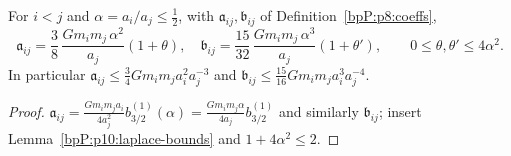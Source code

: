 \begin{corollary}\label{bpP:p10:formula69}
For $i<j$ and $\alpha=a_i/a_j\le\frac12$, with $\mathfrak a_{ij},\mathfrak b_{ij}$ of Definition~\ref{bpP:p8:coeffs},
\[\mathfrak a_{ij}=\frac38\,\frac{Gm_im_j\,\alpha^2}{a_j}(1+\theta),\quad\mathfrak b_{ij}=\frac{15}{32}\,\frac{Gm_im_j\,\alpha^3}{a_j}(1+\theta'),\qquad0\le\theta,\theta'\le4\alpha^2 .\]
In particular $\mathfrak a_{ij}\le\frac34Gm_im_ja_i^2a_j^{-3}$ and $\mathfrak b_{ij}\le\frac{15}{16}Gm_im_ja_i^3a_j^{-4}$.
\end{corollary}
\begin{proof}
$\mathfrak a_{ij}=\frac{Gm_im_ja_i}{4a_j^2}b^{(1)}_{3/2}(\alpha)=\frac{Gm_im_j\alpha}{4a_j}b^{(1)}_{3/2}$ and similarly $\mathfrak b_{ij}$; insert Lemma~\ref{bpP:p10:laplace-bounds} and $1+4\alpha^2\le2$.
\end{proof}

